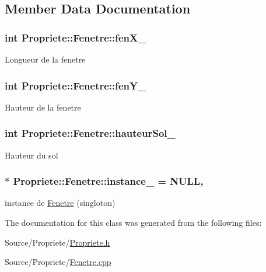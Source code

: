 \subsection{Member Data Documentation}
\hypertarget{classPropriete_1_1Fenetre_ab958f291fecae23304d6e60a32b6134f}{
\subsubsection[{fen\-X\-\_\-}]{\setlength{\rightskip}{0pt plus 5cm}int Propriete\-::\-Fenetre\-::fen\-X\-\_\-\hspace{0.3cm}{\ttfamily [private]}}}\label{classPropriete_1_1Fenetre_ab958f291fecae23304d6e60a32b6134f}
Longueur de la fenetre \hypertarget{classPropriete_1_1Fenetre_a0c6f0ef16ffa6f50c60cb275bcead8ef}{
\subsubsection[{fen\-Y\-\_\-}]{\setlength{\rightskip}{0pt plus 5cm}int Propriete\-::\-Fenetre\-::fen\-Y\-\_\-\hspace{0.3cm}{\ttfamily [private]}}}\label{classPropriete_1_1Fenetre_a0c6f0ef16ffa6f50c60cb275bcead8ef}
Hauteur de la fenetre \hypertarget{classPropriete_1_1Fenetre_ae462a2e277bbdb82ec51bf753c5bb2d2}{
\subsubsection[{hauteur\-Sol\-\_\-}]{\setlength{\rightskip}{0pt plus 5cm}int Propriete\-::\-Fenetre\-::hauteur\-Sol\-\_\-\hspace{0.3cm}{\ttfamily [private]}}}\label{classPropriete_1_1Fenetre_ae462a2e277bbdb82ec51bf753c5bb2d2}
Hauteur du sol \hypertarget{classPropriete_1_1Fenetre_a50360c9aaaa7f5e35d92045929ffd9d5}{
\subsubsection[{instance\-\_\-}]{ $\ast$ Propriete\-::\-Fenetre\-::instance\-\_\- = N\-U\-L\-L\hspace{0.3cm}{\ttfamily [static]}, {\ttfamily [private]}}}\label{classPropriete_1_1Fenetre_a50360c9aaaa7f5e35d92045929ffd9d5}
instance de \hyperlink{classPropriete_1_1Fenetre}{Fenetre} (singloton) 

The documentation for this class was generated from the following files\-:\begin{DoxyCompactItemize}
\item 
Source/\-Propriete/\hyperlink{Propriete_8h}{Propriete.\-h}\item 
Source/\-Propriete/\hyperlink{Fenetre_8cpp}{Fenetre.\-cpp}\end{DoxyCompactItemize}
